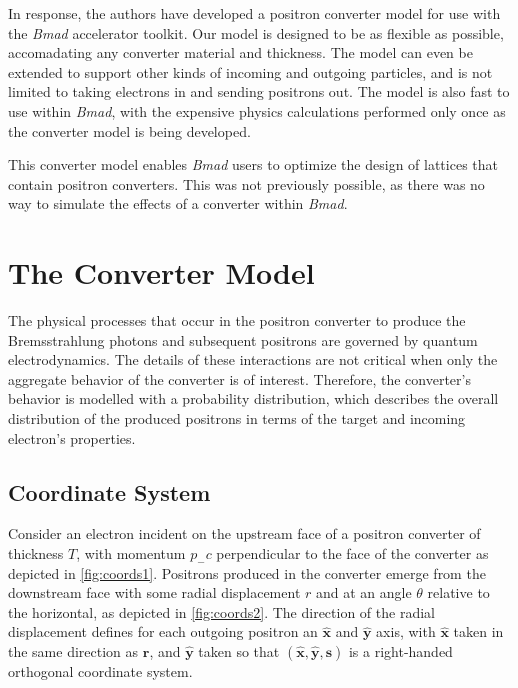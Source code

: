 \documentclass[letter,
               biblatex,     %
               keeplastbox,   %
               ]{jacow}
\newcommand{\bmad}{\textit{Bmad}}
\newcommand{\xx}{\mathbf{\hat{x}}}
\newcommand{\yy}{\mathbf{\hat{y}}}
\newcommand{\rrr}{\mathbf{r}}
\begin{document}
In response, the authors have developed a positron converter model for use with the \bmad{} accelerator toolkit.
Our model is designed to be as flexible as possible, accomadating any converter material and thickness.
The model can even be extended to support other kinds of incoming and outgoing particles, and is not limited to taking electrons in and sending positrons out.
The model is also fast to use within \bmad{}, with the expensive physics calculations performed only once as the converter model is being developed. %

This converter model enables \bmad{} users to optimize the design of lattices that contain positron converters.
This was not previously possible, as there was no way to simulate the effects of a converter within \bmad{}. %


\section{The Converter Model}

The physical processes that occur in the positron converter to produce the Bremsstrahlung photons and subsequent positrons are governed by quantum electrodynamics. %
The details of these interactions are not critical when only the aggregate behavior of the converter is of interest.
Therefore, the converter's behavior is modelled with a probability distribution, which describes the overall distribution of the produced positrons in terms of the target and incoming electron's properties. %

\subsection{Coordinate System}

Consider an electron incident on the upstream face of a positron converter of thickness $T$, with momentum $p_- c$ perpendicular to the face of the converter as depicted in \ref{fig:coords1}.
Positrons produced in the converter emerge from the downstream face with some radial displacement $r$ and at an angle $\theta$ relative to the horizontal, as depicted in \ref{fig:coords2}.
The direction of the radial displacement defines for each outgoing positron an $\xx$ and $\yy$ axis, with $\xx$ taken in the same direction as $\rrr$, and $\yy$ taken so that $(\xx, \yy, \mathbf{s})$ is a right-handed orthogonal coordinate system.
\end{document}
